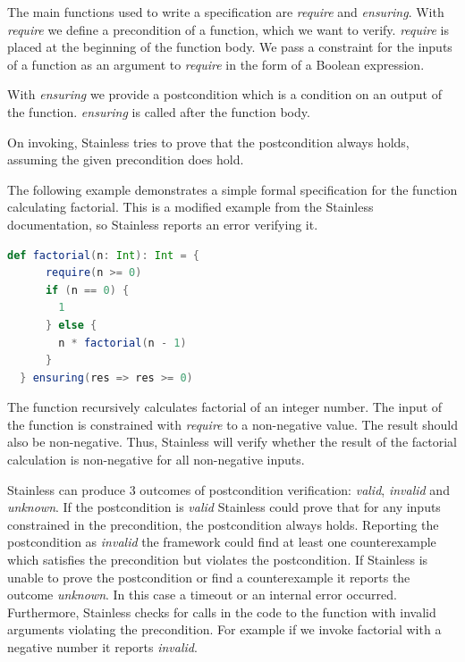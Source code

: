 The main functions used to write a specification are \textit{require} and \textit{ensuring}. 
With \textit{require} we define a precondition of a function, which we want to verify.
\textit{require} is placed at the beginning of the function body.
We pass a constraint for the inputs of a function as an argument to \textit{require} in the form of a Boolean expression.

With \textit{ensuring} we provide a postcondition which is a condition on an output of the function.
\textit{ensuring} is called after the function body.

On invoking, Stainless tries to prove that the postcondition always holds, assuming the given precondition does hold. \cite{Stainless:introduction}

The following example demonstrates a simple formal specification for the function calculating factorial.
This is a modified example from the Stainless documentation, so Stainless reports an error verifying it.
\begin{lstlisting}[language=Scala]
  def factorial(n: Int): Int = {
      require(n >= 0)
      if (n == 0) {
        1
      } else {
        n * factorial(n - 1)
      }
  } ensuring(res => res >= 0)
\end{lstlisting}

The function recursively calculates factorial of an integer number.
The input of the function is constrained with \textit{require} to a non-negative value.
The result should also be non-negative.
Thus, Stainless will verify whether the result of the factorial calculation is non-negative for all non-negative inputs.

Stainless can produce 3 outcomes of postcondition verification: \textit{valid}, \textit{invalid} and \textit{unknown}.
If the postcondition is \textit{valid} Stainless could prove that for any inputs constrained in the precondition, the postcondition always holds.
Reporting the postcondition as \textit{invalid} the framework could find at least one counterexample which satisfies the precondition but violates the postcondition.
If Stainless is unable to prove the postcondition or find a counterexample it reports the outcome \textit{unknown}.
In this case a timeout or an internal error occurred.
Furthermore, Stainless checks for calls in the code to the function with invalid arguments violating the precondition.
For example if we invoke factorial with a negative number it reports \textit{invalid}. \cite{Stainless:introduction}

